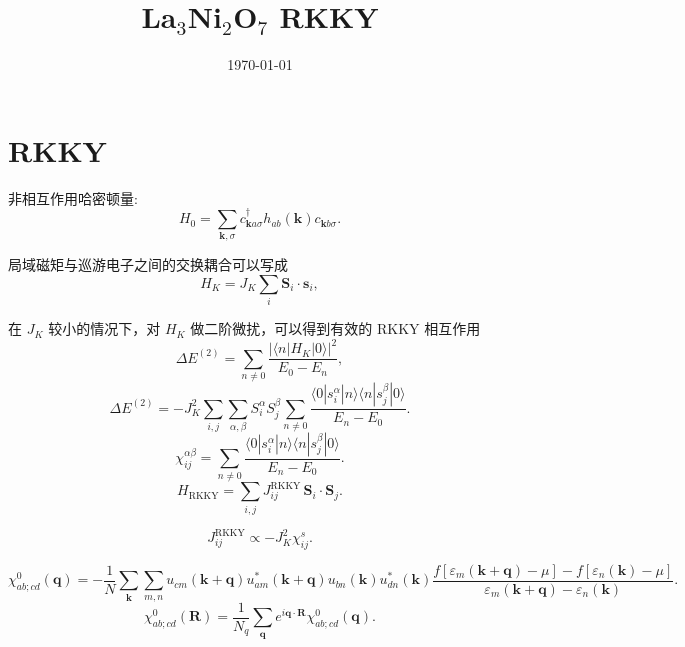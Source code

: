 \documentclass[UTF8,11pt]{ctexart}
\title{La$_3$Ni$_2$O$_7$ RKKY }
\author{}
\date{\today}
\begin{document}
\maketitle

\section{RKKY}

非相互作用哈密顿量:
\begin{equation}
    H_0
    =
    \sum_{\mathbf k,\sigma}
    c_{\mathbf k a\sigma}^{\dagger}
    h_{ab}(\mathbf k)
    c_{\mathbf k b\sigma}.
\end{equation}


局域磁矩与巡游电子之间的交换耦合可以写成
\begin{equation}
    H_K
    =
    J_K
    \sum_i
    \mathbf S_i \cdot \mathbf s_i,
\end{equation}

在 $J_K$ 较小的情况下，对 $H_K$ 做二阶微扰，可以得到有效的 RKKY 相互作用
\begin{equation}
    \Delta E^{(2)}
    =
    \sum_{n\neq 0}
    \frac{
        \left|
        \langle n | H_K | 0 \rangle
        \right|^2
    }{
        E_0-E_n
    },
\end{equation}
\begin{equation}
    \Delta E^{(2)}
    =
    -
    J_K^2
    \sum_{i,j}
    \sum_{\alpha,\beta}
    S_i^\alpha S_j^\beta
    \sum_{n\neq 0}
    \frac{
        \langle 0 | s_i^\alpha | n \rangle
        \langle n | s_j^\beta | 0 \rangle
    }{
        E_n-E_0
    }.
\end{equation}
\begin{equation}
    \chi_{ij}^{\alpha\beta}
    =
    \sum_{n\neq 0}
    \frac{
        \langle 0 | s_i^\alpha | n \rangle
        \langle n | s_j^\beta | 0 \rangle
    }{
        E_n-E_0
    }.
\end{equation}
\begin{equation}
    H_{\mathrm{RKKY}}
    =
    \sum_{i,j}
    J_{ij}^{\mathrm{RKKY}}
    \,
    \mathbf S_i \cdot \mathbf S_j .
\end{equation}

\begin{equation}
    J_{ij}^{\mathrm{RKKY}}
    \propto
    -
    J_K^2
    \chi_{ij}^{s}.
\end{equation}


\begin{equation}
    \chi^{0}_{ab;cd}(\mathbf q)
    =
    -
    \frac{1}{N}
    \sum_{\mathbf k}
    \sum_{m,n}
    u_{c m}(\mathbf k+\mathbf q)
    u^{*}_{a m}(\mathbf k+\mathbf q)
    u_{b n}(\mathbf k)
    u^{*}_{d n}(\mathbf k)
    \frac{
        f[\varepsilon_m(\mathbf k+\mathbf q)-\mu]
        -
        f[\varepsilon_n(\mathbf k)-\mu]
    }{
        \varepsilon_m(\mathbf k+\mathbf q)
        -
        \varepsilon_n(\mathbf k)
    }.
    \label{eq:multi_orbital_chi}
\end{equation}
\begin{equation}
    \chi^{0}_{ab;cd}(\mathbf R)
    =
    \frac{1}{N_q}
    \sum_{\mathbf q}
    e^{i\mathbf q\cdot \mathbf R}
    \chi^{0}_{ab;cd}(\mathbf q).
\end{equation}
\end{document}
